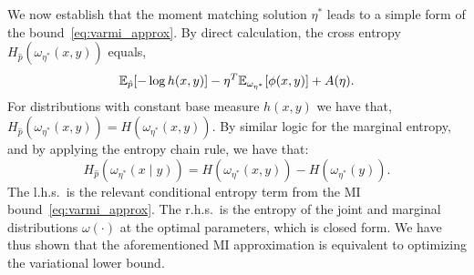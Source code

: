 We now establish that the moment matching solution $\eta^{*}$ leads to
a simple form of the bound~\eqref{eq:varmi_approx}.  By direct
calculation, the cross entropy $H_{\hat{p}}(\omega_{\eta^*}(x,y))$
equals,
\begin{equation}
  \mathbb{E}_{\hat{p}}[ - \log h(x,y) ] - \eta^T \mathbb{E}_{\omega_{\eta^*}}[ \phi(x,y) ] + A(\eta).
\end{equation}
For distributions with constant base measure $h(x,y)$ we have that,
$H_{\hat{p}}(\omega_{\eta^*}(x,y)) = H(\omega_{\eta^*}(x,y))$.  By
similar logic for the marginal entropy, and by applying the entropy
chain rule, we have that:
\begin{equation}
  H_{\hat{p}}( \omega_{\eta^*}(x\mid y) ) = H(\omega_{\eta^*}(x,y)) - H(\omega_{\eta^*}(y)).
\end{equation}
The l.h.s.~is the relevant conditional entropy term from the MI
bound~\eqref{eq:varmi_approx}.  The r.h.s.~is the entropy of the joint
and marginal distributions $\omega(\cdot)$ at the optimal parameters,
which is closed form.  We have thus shown that the aforementioned MI
approximation is equivalent to optimizing the variational lower bound.



